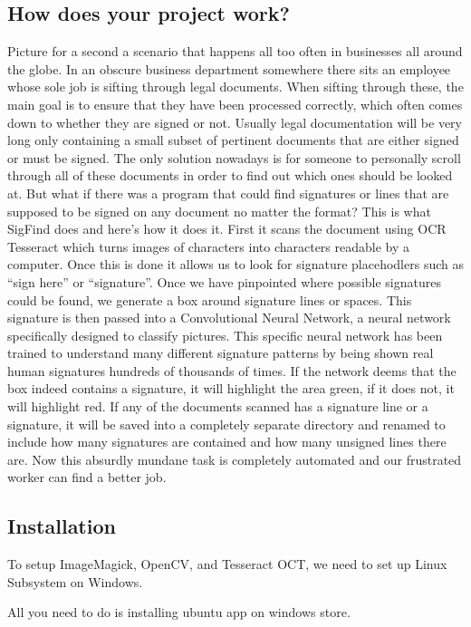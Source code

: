 \documentclass[article, onecolumn, draftclsnofoot,10pt, compsoc]{IEEEtran}
\begin{document}
\subsection{How does your project work?}
Picture for a second a scenario that happens all too often in businesses all around the globe. In an obscure business department somewhere there sits an employee whose sole job is sifting through legal documents. When sifting through these, the main goal is to ensure that they have been processed correctly, which often comes down to whether they are signed or not. Usually legal documentation will be very long only containing a small subset of pertinent documents that are either signed or must be signed. The only solution nowadays is for someone to personally scroll through all of these documents in order to find out which ones should be looked at. But what if there was a program that could find signatures or lines that are supposed to be signed on any document no matter the format? This is what SigFind does and here’s how it does it. First it scans the document using OCR Tesseract which turns images of characters into characters readable by a computer. Once this is done it allows us to look for signature placehodlers such as “sign here” or “signature”. Once we have pinpointed where possible signatures could be found, we generate a box around signature lines or spaces. This signature is then passed into a Convolutional Neural Network, a neural network specifically designed to classify pictures. This specific neural network has been trained to understand many different signature patterns by being shown real human signatures hundreds of thousands of times. If the network deems that the box indeed contains a signature, it will highlight the area green, if it does not, it will highlight red. If any of the documents scanned has a signature line or a signature, it will be saved into a completely separate directory and renamed to include how many signatures are contained and how many unsigned lines there are. Now this absurdly mundane task is completely automated and our frustrated worker can find a better job. 

\subsection{Installation}
To setup ImageMagick, OpenCV, and Tesseract OCT, we need to set up Linux Subsystem on Windows.

All you need to do is installing ubuntu app on windows store.
\end{document}
